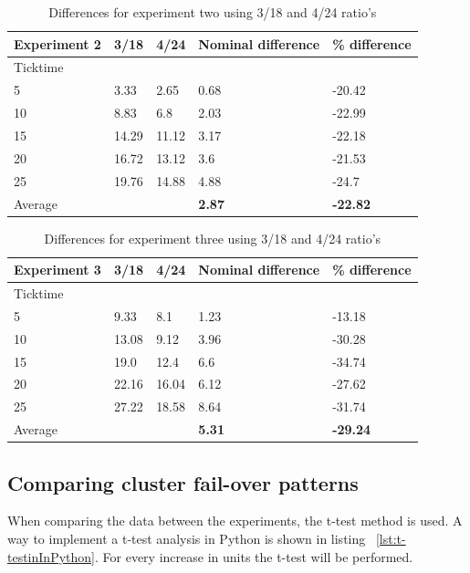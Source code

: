 \begin{table}[!htbp]
\begin{tabular}{| l | l | l | l | l |}
\hline
Experiment 2 & 3/18 & 4/24 & Nominal difference & \% difference \\ \hline
Ticktime &&&& \\ \hline
5 & 3.33 & 2.65 & 0.68 & -20.42 \\ \hline
10 & 8.83 & 6.8 & 2.03 & -22.99 \\ \hline
15 & 14.29 & 11.12 & 3.17 & -22.18 \\ \hline
20 & 16.72 & 13.12 & 3.6 & -21.53 \\ \hline
25 & 19.76 & 14.88 & 4.88 & -24.7 \\ \hline \hline
Average &&& \textbf{2.87} & \textbf{-22.82} \\ \hline
\end{tabular}
\caption{Differences for experiment two using 3/18 and 4/24 ratio's}
\label{table:Diff34ex2}
\end{table}

\begin{table}[!htbp]
\begin{tabular}{| l | l | l | l | l |}
\hline
Experiment 3 & 3/18 & 4/24 & Nominal difference & \% difference \\ \hline
Ticktime &&&& \\ \hline
5 & 9.33 & 8.1 & 1.23 & -13.18 \\ \hline
10 & 13.08 & 9.12 & 3.96 & -30.28 \\ \hline
15 & 19.0 & 12.4 & 6.6 & -34.74 \\ \hline
20 & 22.16 & 16.04 & 6.12 & -27.62 \\ \hline
25 & 27.22 & 18.58 & 8.64 & -31.74 \\ \hline \hline
Average &&& \textbf{5.31} & \textbf{-29.24} \\ \hline
\end{tabular}
\caption{Differences for experiment three using 3/18 and 4/24 ratio's}
\label{table:Diff34ex3}
\end{table}

\newpage

\subsection{Comparing cluster fail-over patterns}
When comparing the data between the experiments, the t-test method is used. A way to implement a t-test analysis in Python is shown in listing ~\ref{lst:t-testinInPython}. For every increase in units the t-test will be performed.

